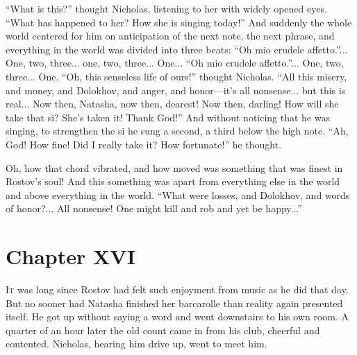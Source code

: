 ``What is this?'' thought Nicholas, listening to her with widely
opened eyes. ``What has happened to her? How she is singing
today!'' And suddenly the whole world centered for him on
anticipation of the next note, the next phrase, and everything in
the world was divided into three beats: ``Oh mio crudele
affetto.''... One, two, three... one, two, three...  One... ``Oh
mio crudele affetto.''... One, two, three... One. ``Oh, this
senseless life of ours!'' thought Nicholas. ``All this misery,
and money, and Dolokhov, and anger, and honor---it's all
nonsense... but this is real... Now then, Natasha, now then,
dearest! Now then, darling! How will she take that si? She's
taken it! Thank God!'' And without noticing that he was singing,
to strengthen the si he sung a second, a third below the high
note. ``Ah, God! How fine! Did I really take it? How fortunate!''
he thought.

Oh, how that chord vibrated, and how moved was something that was
finest in Rostov's soul! And this something was apart from
everything else in the world and above everything in the
world. ``What were losses, and Dolokhov, and words of
honor?... All nonsense! One might kill and rob and yet be
happy...''


\chapter*{Chapter XVI}
\ifaudio
{} 
\fi

\lettrine[lines=2, loversize=0.3, lraise=0]{\initfamily I}{t}
was long since Rostov had felt such enjoyment from music as he
did that day. But no sooner had Natasha finished her barcarolle
than reality again presented itself. He got up without saying a
word and went downstairs to his own room. A quarter of an hour
later the old count came in from his club, cheerful and
contented. Nicholas, hearing him drive up, went to meet him.

